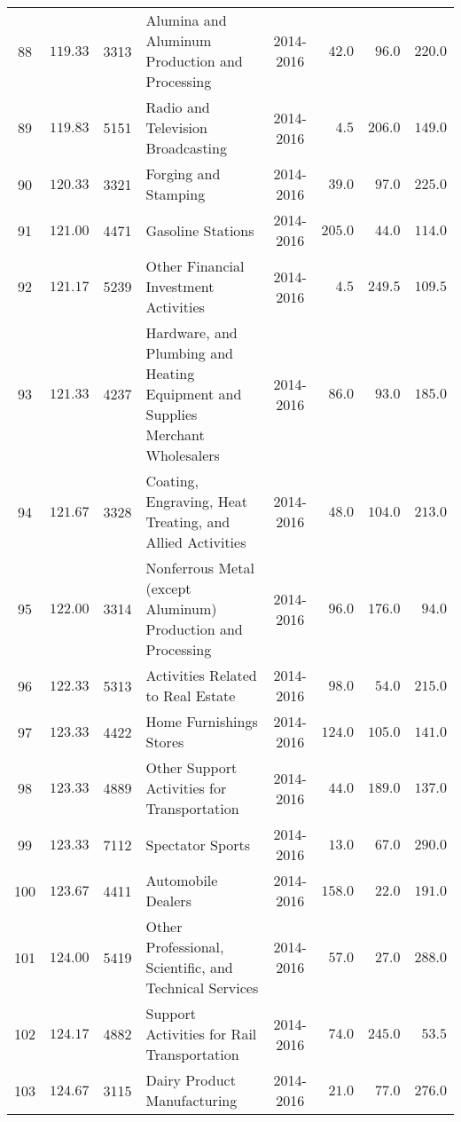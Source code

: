 \documentclass[9pt, oneside]{article}   	%
\begin{document}
\begin{longtable}{cccp{2.0in}cccc}
88  & $119.33$ & 3313 & Alumina and Aluminum Production and Processing & 2014-2016 & $\phantom{0}42.0$ & $\phantom{0}96.0$ & $220.0$ \\
89  & $119.83$ & 5151 & Radio and Television Broadcasting & 2014-2016 & $\phantom{00}4.5$ & $206.0$ & $149.0$ \\
90  & $120.33$ & 3321 & Forging and Stamping & 2014-2016 & $\phantom{0}39.0$ & $\phantom{0}97.0$ & $225.0$ \\
91  & $121.00$ & 4471 & Gasoline Stations & 2014-2016 & $205.0$ & $\phantom{0}44.0$ & $114.0$ \\
92  & $121.17$ & 5239 & Other Financial Investment Activities & 2014-2016 & $\phantom{00}4.5$ & $249.5$ & $109.5$ \\
93  & $121.33$ & 4237 & Hardware, and Plumbing and Heating Equipment and Supplies Merchant Wholesalers & 2014-2016 & $\phantom{0}86.0$ & $\phantom{0}93.0$ & $185.0$ \\
94  & $121.67$ & 3328 & Coating, Engraving, Heat Treating, and Allied Activities & 2014-2016 & $\phantom{0}48.0$ & $104.0$ & $213.0$ \\
95  & $122.00$ & 3314 & Nonferrous Metal (except Aluminum) Production and Processing & 2014-2016 & $\phantom{0}96.0$ & $176.0$ & $\phantom{0}94.0$ \\
96  & $122.33$ & 5313 & Activities Related to Real Estate & 2014-2016 & $\phantom{0}98.0$ & $\phantom{0}54.0$ & $215.0$ \\
97  & $123.33$ & 4422 & Home Furnishings Stores & 2014-2016 & $124.0$ & $105.0$ & $141.0$ \\
98  & $123.33$ & 4889 & Other Support Activities for Transportation & 2014-2016 & $\phantom{0}44.0$ & $189.0$ & $137.0$ \\
99  & $123.33$ & 7112 & Spectator Sports & 2014-2016 & $\phantom{0}13.0$ & $\phantom{0}67.0$ & $290.0$ \\
100  & $123.67$ & 4411 & Automobile Dealers & 2014-2016 & $158.0$ & $\phantom{0}22.0$ & $191.0$ \\
101  & $124.00$ & 5419 & Other Professional, Scientific, and Technical Services & 2014-2016 & $\phantom{0}57.0$ & $\phantom{0}27.0$ & $288.0$ \\
102  & $124.17$ & 4882 & Support Activities for Rail Transportation & 2014-2016 & $\phantom{0}74.0$ & $245.0$ & $\phantom{0}53.5$ \\
103  & $124.67$ & 3115 & Dairy Product Manufacturing & 2014-2016 & $\phantom{0}21.0$ & $\phantom{0}77.0$ & $276.0$ \\

\end{longtable}
\end{document}
